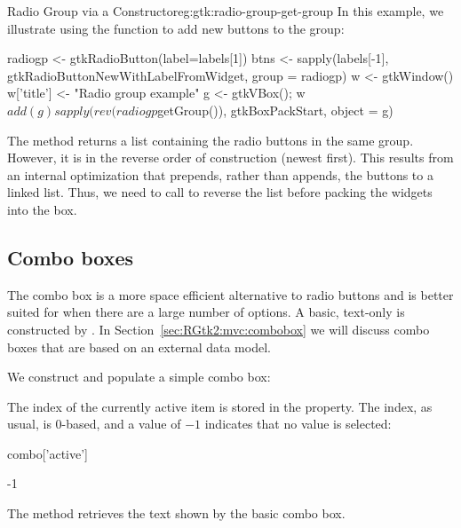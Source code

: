 \begin{example}{Radio Group via a 
    Constructor}{eg:gtk:radio-group-get-group}
  In this example, we illustrate using the
   function to add
  new buttons to the group:
\begin{Schunk}
\begin{Sinput}
 radiogp <- gtkRadioButton(label=labels[1])
 btns <- sapply(labels[-1], gtkRadioButtonNewWithLabelFromWidget, 
                group = radiogp)
 w <- gtkWindow()
 w['title'] <- "Radio group example"
 g <- gtkVBox(); w$add(g)
 sapply(rev(radiogp$getGroup()), gtkBoxPackStart, object = g)
\end{Sinput}
\end{Schunk}
%
The  method returns a list containing
the radio buttons in the same group. However, it is in the reverse
order of construction (newest first). This results from an internal
optimization that prepends, rather than appends, the buttons to a
linked list. Thus, we need to call  to reverse the list
before packing the widgets into the box.

\end{example}

\subsection{Combo boxes}
\label{sec:RGtk2:basic:combobox}

The combo box is a more space efficient alternative to radio buttons
and is better suited for when there are a large number of options. A
basic, text-only  is constructed by
. In
Section~\ref{sec:RGtk2:mvc:combobox} we will discuss combo boxes that
are based on an external data model.

We construct and populate a simple combo box:
\begin{Schunk}
\end{Schunk}
%

The index of the currently active item is stored in the
 property. The index, as usual, is $0$-based,
and a value of $-1$ indicates that no value is selected:
\begin{Schunk}
\begin{Sinput}
 combo['active']
\end{Sinput}
\begin{Soutput}
[1] -1
\end{Soutput}
\end{Schunk}
%
The  method retrieves
the text shown by the basic combo box.

